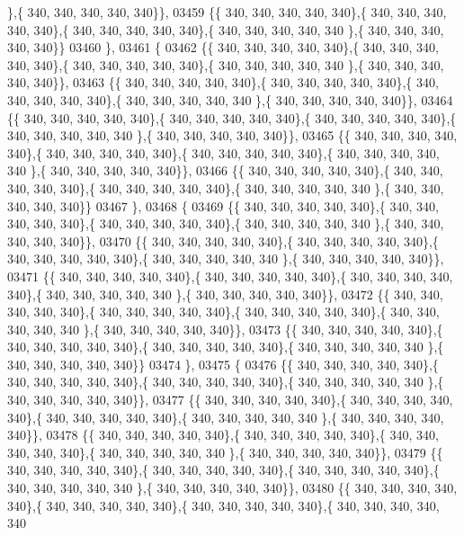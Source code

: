 \begin{DoxyCode}
      \},\{ 340, 340, 340, 340, 340\}\},
03459 \{\{ 340, 340, 340, 340, 340\},\{ 340, 340, 340, 340, 340\},\{ 340, 340, 340, 340, 340\},\{ 340, 340, 340, 340, 340
      \},\{ 340, 340, 340, 340, 340\}\}
03460 \},
03461 \{
03462 \{\{ 340, 340, 340, 340, 340\},\{ 340, 340, 340, 340, 340\},\{ 340, 340, 340, 340, 340\},\{ 340, 340, 340, 340, 340
      \},\{ 340, 340, 340, 340, 340\}\},
03463 \{\{ 340, 340, 340, 340, 340\},\{ 340, 340, 340, 340, 340\},\{ 340, 340, 340, 340, 340\},\{ 340, 340, 340, 340, 340
      \},\{ 340, 340, 340, 340, 340\}\},
03464 \{\{ 340, 340, 340, 340, 340\},\{ 340, 340, 340, 340, 340\},\{ 340, 340, 340, 340, 340\},\{ 340, 340, 340, 340, 340
      \},\{ 340, 340, 340, 340, 340\}\},
03465 \{\{ 340, 340, 340, 340, 340\},\{ 340, 340, 340, 340, 340\},\{ 340, 340, 340, 340, 340\},\{ 340, 340, 340, 340, 340
      \},\{ 340, 340, 340, 340, 340\}\},
03466 \{\{ 340, 340, 340, 340, 340\},\{ 340, 340, 340, 340, 340\},\{ 340, 340, 340, 340, 340\},\{ 340, 340, 340, 340, 340
      \},\{ 340, 340, 340, 340, 340\}\}
03467 \},
03468 \{
03469 \{\{ 340, 340, 340, 340, 340\},\{ 340, 340, 340, 340, 340\},\{ 340, 340, 340, 340, 340\},\{ 340, 340, 340, 340, 340
      \},\{ 340, 340, 340, 340, 340\}\},
03470 \{\{ 340, 340, 340, 340, 340\},\{ 340, 340, 340, 340, 340\},\{ 340, 340, 340, 340, 340\},\{ 340, 340, 340, 340, 340
      \},\{ 340, 340, 340, 340, 340\}\},
03471 \{\{ 340, 340, 340, 340, 340\},\{ 340, 340, 340, 340, 340\},\{ 340, 340, 340, 340, 340\},\{ 340, 340, 340, 340, 340
      \},\{ 340, 340, 340, 340, 340\}\},
03472 \{\{ 340, 340, 340, 340, 340\},\{ 340, 340, 340, 340, 340\},\{ 340, 340, 340, 340, 340\},\{ 340, 340, 340, 340, 340
      \},\{ 340, 340, 340, 340, 340\}\},
03473 \{\{ 340, 340, 340, 340, 340\},\{ 340, 340, 340, 340, 340\},\{ 340, 340, 340, 340, 340\},\{ 340, 340, 340, 340, 340
      \},\{ 340, 340, 340, 340, 340\}\}
03474 \},
03475 \{
03476 \{\{ 340, 340, 340, 340, 340\},\{ 340, 340, 340, 340, 340\},\{ 340, 340, 340, 340, 340\},\{ 340, 340, 340, 340, 340
      \},\{ 340, 340, 340, 340, 340\}\},
03477 \{\{ 340, 340, 340, 340, 340\},\{ 340, 340, 340, 340, 340\},\{ 340, 340, 340, 340, 340\},\{ 340, 340, 340, 340, 340
      \},\{ 340, 340, 340, 340, 340\}\},
03478 \{\{ 340, 340, 340, 340, 340\},\{ 340, 340, 340, 340, 340\},\{ 340, 340, 340, 340, 340\},\{ 340, 340, 340, 340, 340
      \},\{ 340, 340, 340, 340, 340\}\},
03479 \{\{ 340, 340, 340, 340, 340\},\{ 340, 340, 340, 340, 340\},\{ 340, 340, 340, 340, 340\},\{ 340, 340, 340, 340, 340
      \},\{ 340, 340, 340, 340, 340\}\},
03480 \{\{ 340, 340, 340, 340, 340\},\{ 340, 340, 340, 340, 340\},\{ 340, 340, 340, 340, 340\},\{ 340, 340, 340, 340, 340

\end{DoxyCode}
